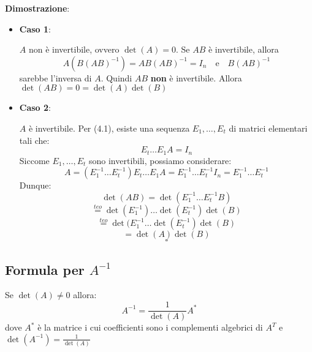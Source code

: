 \documentclass[a4paper]{article}
\theoremstyle{break}
\theoremstyle{break}
\theoremstyle{break}
\theoremstyle{break}
\begin{document}
\vspace{1em}
\noindent \textbf{Dimostrazione}:
\begin{itemize}
  \item \textbf{Caso 1}:

    \( A \) non è invertibile, ovvero \( \det(A) = 0 \). Se \( AB \) è invertibile, allora
    \[
      A(B(AB)^{-1}) = AB(AB)^{-1} = I_n \quad \text{e} \quad B(AB)^{-1}
    \] 
    sarebbe l'inversa di \( A \). Quindi \( AB \) \textbf{non} è invertibile.
    Allora \( \det(AB) = 0 = \det(A) \det(B) \) 

  \item \textbf{Caso 2}:

    \( A \) è invertibile. Per (4.1), esiste una sequenza \( E_1, \ldots, E_t \) di
    matrici elementari tali che:
    \[
    E_t \ldots E_1 A = I_n
    \] 
    Siccome \( E_1, \ldots, E_t \) sono invertibili, possiamo considerare:
    \[
    A = (E_1^{-1} \ldots E_t^{-1})E_t \ldots E_1 A = E_1^{-1} \ldots E_t^{-1}
    I_n = E_1^{-1} \ldots E_t^{-1}
    \] 
    Dunque:
    \[
    \det(AB) = \det(E_1^{-1} \ldots E_t^{-1}B)
    \] 
    \[
      \stackrel{teo}{=} \det(E_1^{-1}) \ldots \det(E_t^{-1}) \det(B)
    \] 
    \[
      \stackrel{teo}{=} \det(E_1^{-1} \ldots \det(E_t^{-1}) \det(B)
    \] 
    \[
    = \det(A) \det(B)
    \] 
    \[
    \square
    \] 
\end{itemize}

\subsection{Formula per \texorpdfstring{\( A^{-1} \)}{A inversa}}
Se \( \det(A) \neq 0 \) allora:
\[
  A^{-1} = \frac{1}{\det(A)} A^*
\] 
dove \( A^* \) è la matrice i cui coefficienti sono i complementi algebrici di \( A^T \)
e \( \det(A^{-1}) = \frac{1}{\det(A)} \) 
\end{document}
